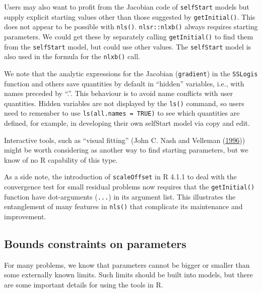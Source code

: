 Users may also want to profit from the Jacobian code of \texttt{selfStart} models
but supply explicit starting values other than those suggested by \texttt{getInitial()}.
This does not appear to be possible with \texttt{nls()}. \texttt{nlsr::nlxb()} always requires
starting parameters. We could get these by separately calling \texttt{getInitial()} to
find them from the \texttt{selfStart} model, but could use other values. The \texttt{selfStart}
model is also used in the formula for the \texttt{nlxb()} call.

We note that the analytic expressions for the Jacobian (\texttt{gradient}) in the \texttt{SSLogis}
function and others save quantities by default in ``hidden'' variables, i.e., with
names preceded by ``.''. This behaviour is to avoid name
conflicts with user quantities. Hidden variables are not displayed by the \texttt{ls()}
command, so users need to remember to use \texttt{ls(all.names\ =\ TRUE)} to see which quantities
are defined, for example, in developing their own selfStart model via copy and edit.

Interactive tools, such as ``visual fitting'' (John C. Nash and Velleman (\protect\hyperlink{ref-nash1996nonlinear}{1996})) might be
worth considering as another way to find starting parameters, but we know of no
R capability of this type.

As a side note, the introduction of \texttt{scaleOffset} in R 4.1.1 to deal with the
convergence test for small residual problems now requires that the \texttt{getInitial()}
function have dot-arguments (\texttt{...}) in its argument list. This illustrates the
entanglement of many features in \texttt{nls()} that complicate its maintenance and
improvement.

\hypertarget{bounds-constraints-on-parameters}{%
\subsection{Bounds constraints on parameters}\label{bounds-constraints-on-parameters}}

For many problems, we know that parameters cannot be bigger or smaller than some
externally known limits. Such limits should be built into models, but there
are some important details for using the tools in R.

